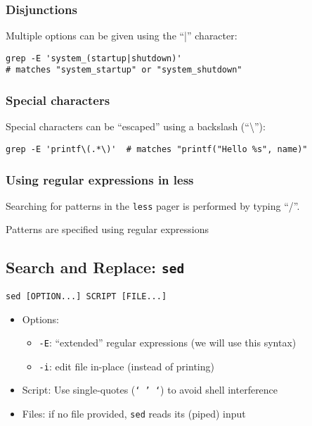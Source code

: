 \documentclass[12pt]{article}
\begin{document}
\subsubsection{Disjunctions}

Multiple options can be given using the ``|'' character:

\begin{verbatim}
grep -E 'system_(startup|shutdown)' 
# matches "system_startup" or "system_shutdown"
\end{verbatim}

\subsubsection{Special characters}

Special characters can be “escaped” using a backslash (“\textbackslash”):

\begin{verbatim}
grep -E 'printf\(.*\)'  # matches "printf("Hello %s", name)"
\end{verbatim}

\subsubsection{Using regular expressions in less}

Searching for patterns in the \texttt{less} pager is performed by typing ``/''. 

Patterns are specified using regular expressions

\subsection{Search and Replace: \texttt{sed}}

\texttt{sed [OPTION...] SCRIPT [FILE...]}

\begin{itemize}
    \item Options:
    \begin{itemize}
        \item \texttt{-E}: ``extended'' regular expressions (we will use this syntax)
        \item \texttt{-i}: edit file in-place (instead of printing)
    \end{itemize}
    \item Script: Use single-quotes (\texttt{` ' `}) to avoid shell interference
    \item Files: if no file provided, \texttt{sed} reads its (piped) input
\end{itemize}
\end{document}
